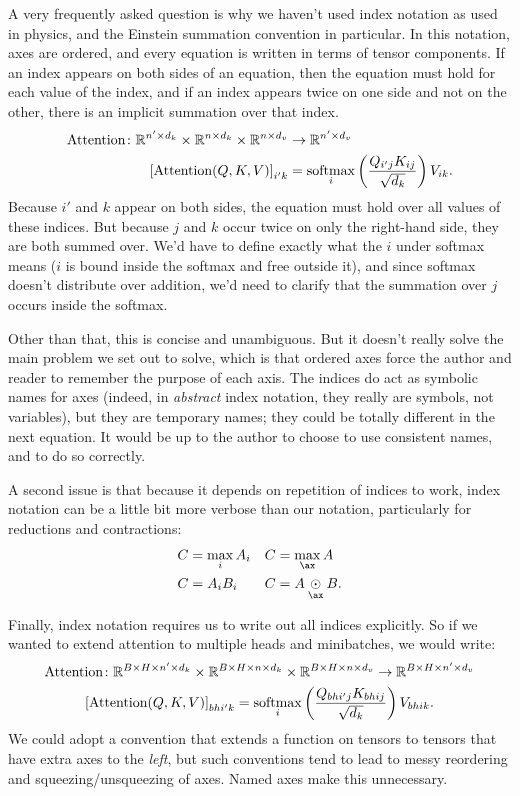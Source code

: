 A very frequently asked question is why we haven't used index notation as used in physics, and the Einstein summation convention in particular. In this notation, axes are ordered, and every equation is written in terms of tensor components.
If an index appears on both sides of an equation, then the equation must hold for each value of the index, and if an index appears twice on one side and not on the other, there is an implicit summation over that index.
\begin{align*}
  \text{Attention} \colon \mathbb{R}^{n' \times d_k} \times \mathbb{R}^{n \times d_k} \times \mathbb{R}^{n \times d_v} &\rightarrow \mathbb{R}^{n' \times d_v} \\
  \left[\text{Attention}(Q, K, V)\right]_{i'k} &= \operatorname*{softmax}_i \left( \frac{Q_{i'j} K_{ij}}{\sqrt{d_k}} \right) V_{ik}.
\end{align*}
Because $i'$ and $k$ appear on both sides, the equation must hold over all values of these indices. But because $j$ and $k$ occur twice on only the right-hand side, they are both summed over. We'd have to define exactly what the $i$ under softmax means ($i$ is bound inside the softmax and free outside it), and since softmax doesn't distribute over addition, we'd need to clarify that the summation over $j$ occurs inside the softmax.

Other than that, this is concise and unambiguous. But it doesn't really solve the main problem we set out to solve, which is that ordered axes force the author and reader to remember the purpose of each axis. The indices do act as symbolic names for axes (indeed, in \emph{abstract} index notation, they really are symbols, not variables), but they are temporary names; they could be totally different in the next equation. It would be up to the author to choose to use consistent names, and to do so correctly.

A second issue is that because it depends on repetition of indices to work, index notation can be a little bit more verbose than our notation, particularly for reductions and contractions:
\begin{align*}
  C &= \max_i A_i & C &=\nfun{\ax}{max} A \\
  C &= A_i B_i & C &= A \ndot{\ax} B.
\end{align*}

Finally, index notation requires us to write out all indices explicitly. So if we wanted to extend attention to multiple heads and minibatches, we would write:
\begin{gather*}
  \text{Attention} \colon \mathbb{R}^{B \times H \times n' \times d_k} \times \mathbb{R}^{B \times H \times n \times d_k} \times \mathbb{R}^{B \times H \times n \times d_v} \rightarrow \mathbb{R}^{B \times H \times n' \times d_v} \\
  \left[\text{Attention}(Q, K, V)\right]_{bhi'k} = \operatorname*{softmax}_i \left( \frac{Q_{bhi'j} K_{bhij}}{\sqrt{d_k}} \right) V_{bhik}.
\end{gather*}
We could adopt a convention that extends a function on tensors to tensors that have extra axes to the \emph{left}, but such conventions tend to lead to messy reordering and squeezing/unsqueezing of axes. Named axes make this unnecessary.

